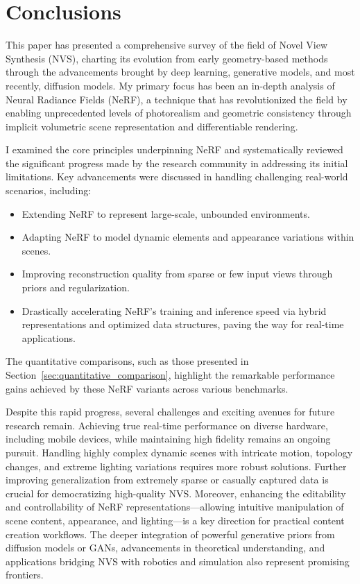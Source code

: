 
\section{Conclusions}
\label{sec:conclusions}

This paper has presented a comprehensive survey of the field of Novel View Synthesis (NVS), charting its evolution from early geometry-based methods through the advancements brought by deep learning, generative models, and most recently, diffusion models. My primary focus has been an in-depth analysis of Neural Radiance Fields (NeRF), a technique that has revolutionized the field by enabling unprecedented levels of photorealism and geometric consistency through implicit volumetric scene representation and differentiable rendering.

I examined the core principles underpinning NeRF and systematically reviewed the significant progress made by the research community in addressing its initial limitations. Key advancements were discussed in handling challenging real-world scenarios, including:
\begin{itemize}
    \itemsep0em %
    \item Extending NeRF to represent large-scale, unbounded environments.
    \item Adapting NeRF to model dynamic elements and appearance variations within scenes.
    \item Improving reconstruction quality from sparse or few input views through priors and regularization.
    \item Drastically accelerating NeRF's training and inference speed via hybrid representations and optimized data structures, paving the way for real-time applications.
\end{itemize}
The quantitative comparisons, such as those presented in Section~\ref{sec:quantitative_comparison}, highlight the remarkable performance gains achieved by these NeRF variants across various benchmarks. %

Despite this rapid progress, several challenges and exciting avenues for future research remain. Achieving true real-time performance on diverse hardware, including mobile devices, while maintaining high fidelity remains an ongoing pursuit. Handling highly complex dynamic scenes with intricate motion, topology changes, and extreme lighting variations requires more robust solutions. Further improving generalization from extremely sparse or casually captured data is crucial for democratizing high-quality NVS. Moreover, enhancing the editability and controllability of NeRF representations—allowing intuitive manipulation of scene content, appearance, and lighting—is a key direction for practical content creation workflows. The deeper integration of powerful generative priors from diffusion models or GANs, advancements in theoretical understanding, and applications bridging NVS with robotics and simulation also represent promising frontiers.

